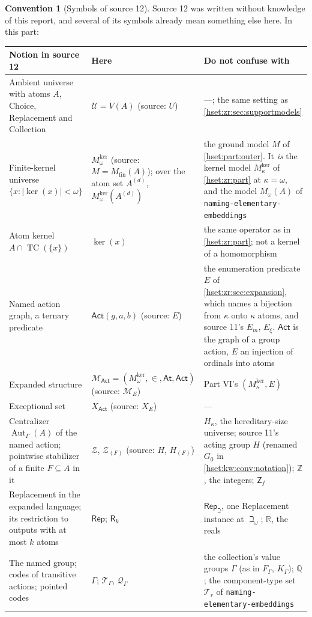 \documentclass[11pt,letterpaper]{article}
\theoremstyle{definition}
\newtheorem{convention}[convention]{Convention}\aliascntresetthe{convention}
\theoremstyle{remark}
\newcommand{\TC}{\operatorname{TC}}
\newcommand{\RepB}{\mathsf{Rep}_{\beth}}
\newcommand{\card}[1]{\lvert#1\rvert}
\newcommand{\Aut}{\operatorname{Aut}}
\newcommand{\repo}[1]{\nolinkurl{#1}}
\newcommand{\Zf}{\mathsf{Z}_{\!f}}
\newcommand{\kerat}{\operatorname{ker}}
\newcommand{\Mker}{M^{\mathrm{ker}}}
\newcommand{\Uk}{\mathcal U}
\newcommand{\R}{\mathbb R}
\newcommand{\Q}{\mathbb Q}
\newcommand{\Z}{\mathbb Z}
\newcommand{\At}{\mathsf{At}}
\newcommand{\Act}{\mathsf{Act}}
\newcommand{\MAct}{\mathcal M_{\Act}}
\newcommand{\calT}{\mathcal T_{\Gamma}}
\newcommand{\calQ}{\mathcal Q_{\Gamma}}
\begin{document}
\begin{convention}[Symbols of source 12]\label{hset:ns:conv:notation}
Source 12 was written without knowledge of this report, and several of its
symbols already mean something else here. In this part:
\begin{center}\small
\begin{longtable}{@{}P{0.25\textwidth}P{0.24\textwidth}P{0.43\textwidth}@{}}
\toprule
Notion in source 12 & Here & Do not confuse with\\
\midrule\endhead
Ambient universe with atoms $A$, Choice, Replacement and Collection & $\Uk=V(A)$ (source: $U$) & ---; the same setting as \cref{hset:zr:sec:supportmodels}\\
Finite-kernel universe $\{x:\card{\kerat(x)}<\omega\}$ & $\Mker_\omega$ (source: $M=M_{\mathrm{fin}}(A)$); over the atom set $A^{(d)}$, $\Mker_\omega(A^{(d)})$ & the ground model $M$ of \cref{hset:part:outer}. It \emph{is} the kernel model $\Mker_\kappa$ of \cref{hset:zr:part} at $\kappa=\omega$, and the model $M_\omega(A)$ of \repo{naming-elementary-embeddings}\\
Atom kernel $A\cap\TC(\{x\})$ & $\kerat(x)$ & the same operator as in \cref{hset:zr:part}; not a kernel of a homomorphism\\
Named action graph, a ternary predicate & $\Act(g,a,b)$ (source: $E$) & the enumeration predicate $E$ of \cref{hset:zr:sec:expansion}, which names a bijection from $\kappa$ onto $\kappa$ atoms, and source 11's $E_m$, $E_\xi$. $\Act$ is the graph of a group action, $E$ an injection of ordinals into atoms\\
Expanded structure & $\MAct=(\Mker_\omega,\in,\At,\Act)$ (source: $\mathcal M_E$) & Part VI's $(\Mker_\kappa,E)$\\
Exceptional set & $X_{\Act}$ (source: $X_E$) & ---\\
Centralizer $\Aut_\Gamma(A)$ of the named action; pointwise stabilizer of a finite $F\subseteq A$ in it & $\mathcal Z$, $\mathcal Z_{(F)}$ (source: $H$, $H_{(F)}$) & $H_\kappa$, the hereditary-size universe; source 11's acting group $H$ (renamed $G_0$ in \cref{hset:kw:conv:notation}); $\Z$, the integers; $\Zf$\\
Replacement in the expanded language; its restriction to outputs with at most $k$ atoms & $\mathsf{Rep}$; $\mathsf R_k$ & $\RepB$, one Replacement instance at $\beth_\omega$; $\R$, the reals\\
The named group; codes of transitive actions; pointed codes & $\Gamma$; $\calT$, $\calQ$ & the collection's value groups $\Gamma$ (as in $F_\Gamma$, $K_\Gamma$); $\Q$; the component-type set $\mathcal T_r$ of \repo{naming-elementary-embeddings}\\

\end{longtable}
\end{center}
\end{convention}
\end{document}
